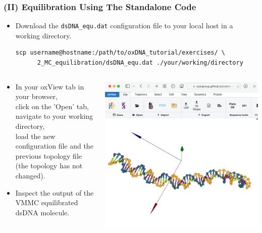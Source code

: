 \documentclass[slidestop,compress,9pt]{beamer}
\begin{document}
\begin{frame}[fragile]
\frametitle{(II) Equilibration Using The Standalone Code}

\begin{itemize}
\item Download the \texttt{dsDNA\_equ.dat} configuration file to your local host in a working directory.
\begin{lstlisting}
scp username@hostname:/path/to/oxDNA_tutorial/exercises/ \
      2_MC_equilibration/dsDNA_equ.dat ./your/working/directory
\end{lstlisting}
\end{itemize}

\begin{columns}

\begin{column}{0.48\textwidth}

\begin{itemize}
\setlength\itemsep{15pt}
\item In your oxView tab in your browser,\\
click on the 'Open' tab,\\
navigate to your working directory,
\\load the new configuration file and the previous topology file\\
(the topology has not changed).

\item Inspect the output of the VMMC equilibrated dsDNA molecule.
\end{itemize}
\end{column}

\begin{column}{0.48\textwidth}

\includegraphics[width=\textwidth]{oxView_dsDNA_equ.png}

\end{column}
\end{columns}

\end{frame}
\end{document}
